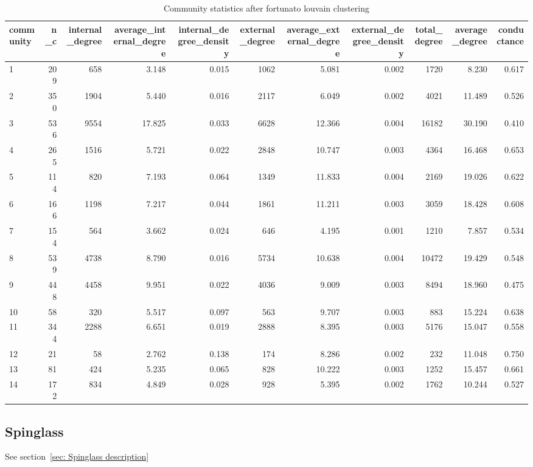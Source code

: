 \begin{table}[ht]
\centering
\begin{adjustbox}{max width=\textwidth}
\begin{tabular}{lrrrrrrrrrr}
  \hline
community & n\_c & internal\_degree & average\_internal\_degree & internal\_degree\_density & external\_degree & average\_external\_degree & external\_degree\_density & total\_degree & average\_degree & conductance \\ 
  \hline
1 & 209 & 658 & 3.148 & 0.015 & 1062 & 5.081 & 0.002 & 1720 & 8.230 & 0.617 \\ 
  2 & 350 & 1904 & 5.440 & 0.016 & 2117 & 6.049 & 0.002 & 4021 & 11.489 & 0.526 \\ 
  3 & 536 & 9554 & 17.825 & 0.033 & 6628 & 12.366 & 0.004 & 16182 & 30.190 & 0.410 \\ 
  4 & 265 & 1516 & 5.721 & 0.022 & 2848 & 10.747 & 0.003 & 4364 & 16.468 & 0.653 \\ 
  5 & 114 & 820 & 7.193 & 0.064 & 1349 & 11.833 & 0.004 & 2169 & 19.026 & 0.622 \\ 
  6 & 166 & 1198 & 7.217 & 0.044 & 1861 & 11.211 & 0.003 & 3059 & 18.428 & 0.608 \\ 
  7 & 154 & 564 & 3.662 & 0.024 & 646 & 4.195 & 0.001 & 1210 & 7.857 & 0.534 \\ 
  8 & 539 & 4738 & 8.790 & 0.016 & 5734 & 10.638 & 0.004 & 10472 & 19.429 & 0.548 \\ 
  9 & 448 & 4458 & 9.951 & 0.022 & 4036 & 9.009 & 0.003 & 8494 & 18.960 & 0.475 \\ 
  10 & 58 & 320 & 5.517 & 0.097 & 563 & 9.707 & 0.003 & 883 & 15.224 & 0.638 \\ 
  11 & 344 & 2288 & 6.651 & 0.019 & 2888 & 8.395 & 0.003 & 5176 & 15.047 & 0.558 \\ 
  12 & 21 & 58 & 2.762 & 0.138 & 174 & 8.286 & 0.002 & 232 & 11.048 & 0.750 \\ 
  13 & 81 & 424 & 5.235 & 0.065 & 828 & 10.222 & 0.003 & 1252 & 15.457 & 0.661 \\ 
  14 & 172 & 834 & 4.849 & 0.028 & 928 & 5.395 & 0.002 & 1762 & 10.244 & 0.527 \\ 
   \hline
\end{tabular}
\end{adjustbox}
\caption{Community statistics after fortunato louvain clustering} 
\label{tab:Community statistics after fortunato louvain clustering}
\end{table}
\subsection{Spinglass}
See section~\ref{sec: Spinglass description}
